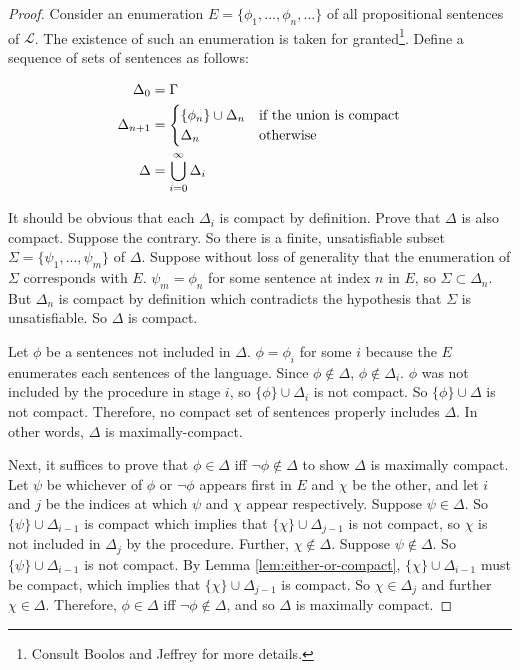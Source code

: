 \documentclass[12pt]{article}
\theoremstyle{definition}
\theoremstyle{remark}
\begin{document}
\begin{proof}
	Consider an enumeration $E = \{ \phi_1, ..., \phi_n, ... \}$ of all propositional sentences of $\mathscr{L}$. The existence of such an enumeration is taken for granted\footnote{Consult Boolos and Jeffrey\cite{boolosjeffrey} for more details.}. Define a sequence of sets of sentences as follows:
	
	\begin{align*}
		\Delta_0 &= \Gamma \\
		\Delta_{n+1} &= \begin{cases}
							\{ \phi_n \} \cup \Delta_n & \textnormal{if the union is compact} \\
							\Delta_n & \textnormal{otherwise}
						\end{cases}\\
		\Delta &= \bigcup_{i=0}^\infty \Delta_i
	\end{align*}
	
	It should be obvious that each $\Delta_i$ is compact by definition. Prove that $\Delta$ is also compact. Suppose the contrary. So there is a finite, unsatisfiable subset $\Sigma = \{ \psi_1, ..., \psi_m \}$ of $\Delta$. Suppose without loss of generality that the enumeration of $\Sigma$ corresponds with $E$. $\psi_m = \phi_n$ for some sentence at index $n$ in $E$, so $\Sigma\subset\Delta_n$. But $\Delta_n$ is compact by definition which contradicts the hypothesis that $\Sigma$ is unsatisfiable. So $\Delta$ is compact.
	
	Let $\phi$ be a sentences not included in $\Delta$. $\phi=\phi_i$ for some $i$ because the $E$ enumerates each sentences of the language. Since $\phi \not\in \Delta$, $\phi \not\in \Delta_i$. $\phi$ was not included by the procedure in stage $i$, so $\{ \phi \} \cup \Delta_i$ is not compact. So $\{ \phi \} \cup \Delta$ is not compact. Therefore, no compact set of sentences properly includes $\Delta$. In other words, $\Delta$ is maximally-compact.
	
	Next, it suffices to prove that $\phi \in \Delta$ iff $\neg\phi \not\in \Delta$ to show $\Delta$ is maximally compact. Let $\psi$ be whichever of $\phi$ or $\neg\phi$ appears first in $E$ and $\chi$ be the other, and let $i$ and $j$ be the indices at which $\psi$ and $\chi$ appear respectively. Suppose $\psi \in \Delta$. So $\{ \psi \} \cup \Delta_{i-1}$ is compact which implies that $\{ \chi \} \cup \Delta_{j-1}$ is not compact, so $\chi$ is not included in $\Delta_j$ by the procedure. Further, $\chi \not\in \Delta$. Suppose $\psi \not\in \Delta$. So $\{ \psi \} \cup \Delta_{i-1}$ is not compact. By Lemma \ref{lem:either-or-compact}, $\{ \chi \} \cup \Delta_{i-1}$ must be compact, which implies that $\{ \chi \} \cup \Delta_{j-1}$ is compact. So $\chi \in \Delta_j$ and further $\chi \in \Delta$. Therefore, $\phi \in \Delta$ iff $\neg\phi \not\in \Delta$, and so $\Delta$ is maximally compact.
\end{proof}
\end{document}
